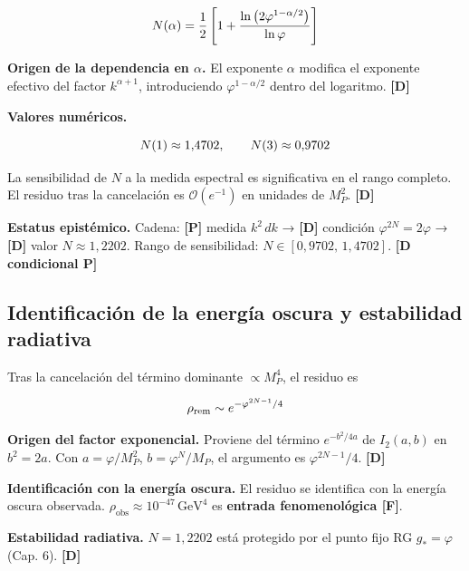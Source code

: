 ﻿\documentclass[11pt,letterpaper]{article}
\begin{document}
\begin{equation*}
  \resizebox{\ifdim\width>\linewidth \linewidth\else\width\fi}{!}{$\displaystyle N(\alpha) = \frac{1}{2}\left[1 + \frac{\ln\left(2\varphi^{1-\alpha/2}\right)}{\ln\varphi}\right]$}
\end{equation*}

\textbf{Origen de la dependencia en $\alpha$.} El exponente $\alpha$ modifica el exponente efectivo del factor $k^{\alpha+1}$, introduciendo $\varphi^{1-\alpha/2}$ dentro del logaritmo. \textbf{[D]}

\textbf{Valores numéricos.}

\begin{equation*}
  \resizebox{\ifdim\width>\linewidth \linewidth\else\width\fi}{!}{$\displaystyle N(1) \approx 1{,}4702, \qquad N(3) \approx 0{,}9702$}
\end{equation*}

La sensibilidad de $N$ a la medida espectral es significativa en el rango completo. El residuo tras la cancelación es $\mathcal{O}(e^{-1})$ en unidades de $M_P^2$. \textbf{[D]}

\textbf{Estatus epistémico.} Cadena: \textbf{[P]} medida $k^2\,dk$ → \textbf{[D]} condición $\varphi^{2N} = 2\varphi$ → \textbf{[D]} valor $N \approx 1{,}2202$. Rango de sensibilidad: $N \in [0{,}9702,\,1{,}4702]$. \textbf{[D condicional P]}
\subsection{Identificación de la energía oscura y estabilidad radiativa}
Tras la cancelación del término dominante $\propto M_P^4$, el residuo es

\begin{equation*}
  \resizebox{\ifdim\width>\linewidth \linewidth\else\width\fi}{!}{$\displaystyle \rho_{\text{rem}} \sim e^{-\varphi^{2N-1}/4}$}
\end{equation*}

\textbf{Origen del factor exponencial.} Proviene del término $e^{-b^2/4a}$ de $I_2(a, b)$ en $b^2 = 2a$. Con $a = \varphi/M_P^2$, $b = \varphi^N/M_P$, el argumento es $\varphi^{2N-1}/4$. \textbf{[D]}

\textbf{Identificación con la energía oscura.} El residuo se identifica con la energía oscura observada. $\rho_{\text{obs}} \approx 10^{-47}\,\text{GeV}^4$ es \textbf{entrada fenomenológica [F]}.

\textbf{Estabilidad radiativa.} $N = 1{,}2202$ está protegido por el punto fijo RG $g_* = \varphi$ (Cap. 6). \textbf{[D]}
\end{document}
